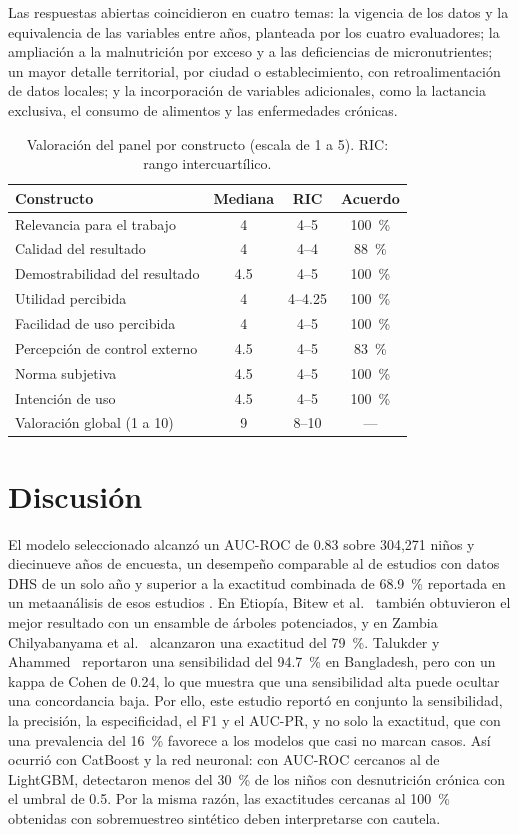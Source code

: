 \documentclass[final,5p,times,twocolumn,number,lefttitle]{elsarticle}
\begin{document}
Las respuestas abiertas coincidieron en cuatro temas: la vigencia de los datos y la equivalencia de las variables entre años, planteada por los cuatro evaluadores; la ampliación a la malnutrición por exceso y a las deficiencias de micronutrientes; un mayor detalle territorial, por ciudad o establecimiento, con retroalimentación de datos locales; y la incorporación de variables adicionales, como la lactancia exclusiva, el consumo de alimentos y las enfermedades crónicas.

\begin{table}[!tp]
\centering
\caption{Valoración del panel por constructo (escala de 1 a 5). RIC: rango intercuartílico.}
\label{tab:panel}
\begin{tabular}{lccc}
\hline
Constructo & Mediana & RIC & Acuerdo \\
\hline
Relevancia para el trabajo & 4 & 4--5 & 100~\% \\
Calidad del resultado & 4 & 4--4 & 88~\% \\
Demostrabilidad del resultado & 4.5 & 4--5 & 100~\% \\
Utilidad percibida & 4 & 4--4.25 & 100~\% \\
Facilidad de uso percibida & 4 & 4--5 & 100~\% \\
Percepción de control externo & 4.5 & 4--5 & 83~\% \\
Norma subjetiva & 4.5 & 4--5 & 100~\% \\
Intención de uso & 4.5 & 4--5 & 100~\% \\
\hline
Valoración global (1 a 10) & 9 & 8--10 & --- \\
\hline
\end{tabular}
\end{table}

\section{Discusión}

El modelo seleccionado alcanzó un AUC-ROC de 0.83 sobre 304,271 niños y diecinueve años de encuesta, un desempeño comparable al de estudios con datos DHS de un solo año y superior a la exactitud combinada de 68.9~\% reportada en un metaanálisis de esos estudios \citep{rao2025metaanalysis}. En Etiopía, Bitew et al.~\citep{bitew2021ethiopia} también obtuvieron el mejor resultado con un ensamble de árboles potenciados, y en Zambia Chilyabanyama et al.~\citep{chilyabanyama2022zambia} alcanzaron una exactitud del 79~\%. Talukder y Ahammed~\citep{talukder2020bangladesh} reportaron una sensibilidad del 94.7~\% en Bangladesh, pero con un kappa de Cohen de 0.24, lo que muestra que una sensibilidad alta puede ocultar una concordancia baja. Por ello, este estudio reportó en conjunto la sensibilidad, la precisión, la especificidad, el F1 y el AUC-PR, y no solo la exactitud, que con una prevalencia del 16~\% favorece a los modelos que casi no marcan casos. Así ocurrió con CatBoost y la red neuronal: con AUC-ROC cercanos al de LightGBM, detectaron menos del 30~\% de los niños con desnutrición crónica con el umbral de 0.5. Por la misma razón, las exactitudes cercanas al 100~\% obtenidas con sobremuestreo sintético \citep{mgomezulu2025malawi} deben interpretarse con cautela.
\end{document}
